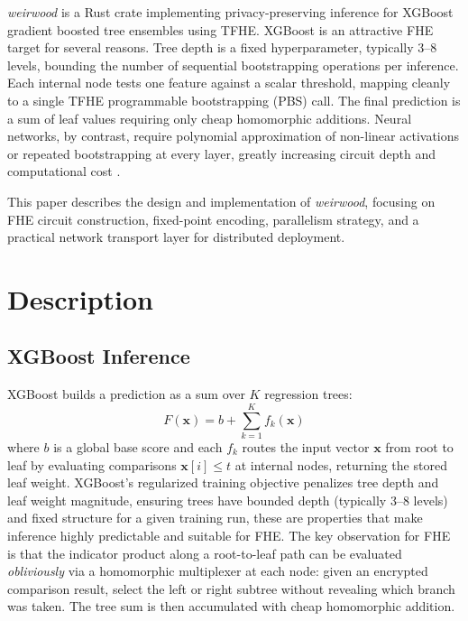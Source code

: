 \documentclass[12pt]{article}
\begin{document}
\textit{weirwood} is a Rust crate implementing privacy-preserving inference for XGBoost gradient boosted tree ensembles \cite{xgboost} using TFHE. XGBoost is an attractive FHE target for several reasons. Tree depth is a fixed hyperparameter, typically 3--8 levels, bounding the number of sequential bootstrapping operations per inference. Each internal node tests one feature against a scalar threshold, mapping cleanly to a single TFHE programmable bootstrapping (PBS) call. The final prediction is a sum of leaf values requiring only cheap homomorphic additions. Neural networks, by contrast, require polynomial approximation of non-linear activations or repeated bootstrapping at every layer, greatly increasing circuit depth and computational cost \cite{gentry}.

This paper describes the design and implementation of \textit{weirwood}, focusing on FHE circuit construction, fixed-point encoding, parallelism strategy, and a practical network transport layer for distributed deployment.

\section{Description}

\subsection{XGBoost Inference}

XGBoost \cite{xgboost} builds a prediction as a sum over $K$ regression trees:
%
\begin{equation}
F(\mathbf{x}) = b + \sum_{k=1}^{K} f_k(\mathbf{x})
\end{equation}
%
where $b$ is a global base score and each $f_k$ routes the input vector $\mathbf{x}$ from root to leaf by evaluating comparisons $\mathbf{x}[i] \leq t$ at internal nodes, returning the stored leaf weight. XGBoost's regularized training objective penalizes tree depth and leaf weight magnitude, ensuring trees have bounded depth (typically 3--8 levels) and fixed structure for a given training run, these are properties that make inference highly predictable and suitable for FHE. The key observation for FHE is that the indicator product along a root-to-leaf path can be evaluated \textit{obliviously} via a homomorphic multiplexer at each node: given an encrypted comparison result, select the left or right subtree without revealing which branch was taken. The tree sum is then accumulated with cheap homomorphic addition.
\end{document}
